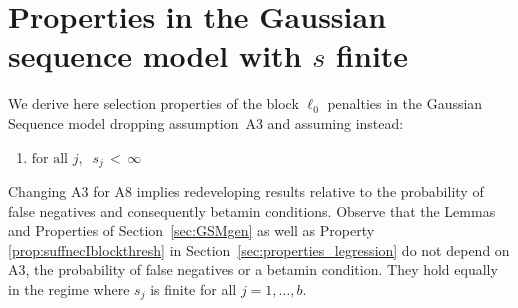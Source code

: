 \documentclass[aos]{imsart}
\theoremstyle{plain}
\begin{document}
\section{Properties in the Gaussian sequence model with $s$ finite}\label{sec:appendixGSMsfinite}

We derive here selection properties of the block $\ell_0$ penalties in the Gaussian Sequence model dropping assumption~A3 and assuming instead:
\begin{enumerate}[start=8,label={(A\arabic*)}]
    \item $\text{for all } j, \;\; s_j \,< \, \infty$
\end{enumerate}

Changing A3 for A8 implies redeveloping results relative to the probability of false negatives and consequently betamin conditions. Observe that the Lemmas and Properties of Section~\ref{sec:GSMgen} as well as Property \ref{prop:suffnecIblockthresh} in Section~\ref{sec:properties_legression} do not depend on A3, the probability of false negatives or a betamin condition. They hold equally in the regime where $s_j$ is finite for all $j=1,\ldots,b$.
\end{document}
